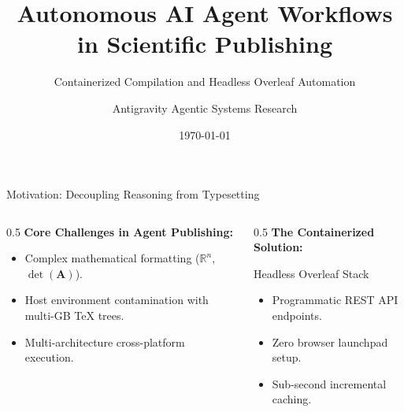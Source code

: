 \documentclass[aspectratio=169]{beamer}
\title[\textbf{Autonomous Scientific Overleaf}]{\textbf{Autonomous AI Agent Workflows in Scientific Publishing}}
\subtitle{Containerized Compilation and Headless Overleaf Automation}
\author[Antigravity Team]{Antigravity Agentic Systems Research}
\institute[DeepMind / Community]{Research \& Development Engineering}
\date{\today}
\begin{document}
\begin{frame}
  \titlepage
\end{frame}

\begin{frame}{Motivation: Decoupling Reasoning from Typesetting}
  \begin{columns}
    \begin{column}{0.5\textwidth}
      \textbf{Core Challenges in Agent Publishing:}
      \begin{itemize}
        \item Complex mathematical formatting ($\mathbb{R}^n$, $\det(\mathbf{A})$).
        \item Host environment contamination with multi-GB TeX trees.
        \item Multi-architecture cross-platform execution.
      \end{itemize}
    \end{column}
    \begin{column}{0.5\textwidth}
      \textbf{The Containerized Solution:}
      \begin{block}{Headless Overleaf Stack}
        \begin{itemize}
          \item Programmatic REST API endpoints.
          \item Zero browser launchpad setup.
          \item Sub-second incremental caching.
        \end{itemize}
      \end{block}
    \end{column}
  \end{columns}
\end{frame}
\end{document}
